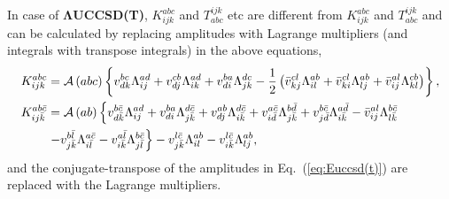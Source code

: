 \documentclass[a4paper,12pt,oneside]{book}
\newcommand{\half}{\frac{1}{2}}
\newcommand{\asop}[1]{{\cal A}\left(#1\right)}
\newcommand{\eq}[1]{Eq.~(\ref{#1})}
\newcommand{\spa}[1]{{#1}}
\newcommand{\spb}[1]{\bar{#1}}
\begin{document}
In case of \textbf{$\mathbf{\Lambda}$UCCSD(T)}, $K^{\spa{a}\spa{b}\spa{c}}_{\spa{i}\spa{j}\spa{k}}$ and $T_{\spa{a}\spa{b}\spa{c}}^{\spa{i}\spa{j}\spa{k}}$ etc 
are different from $K^{\spa{a}\spa{b}\spa{c}}_{\spa{i}\spa{j}\spa{k}}$ and $T_{\spa{a}\spa{b}\spa{c}}^{\spa{i}\spa{j}\spa{k}}$
and can be calculated by replacing amplitudes with Lagrange multipliers (and integrals with transpose integrals) in the above equations,
\begin{equation}
\begin{aligned}
K^{\spa{a}\spa{b}\spa{c}}_{\spa{i}\spa{j}\spa{k}} 
&= \asop{\spa{a}\spa{b}\spa{c}} \left\{ 
  v_{\spa{d}\spa{k}}^{\spa{b}\spa{c}} \Lambda_{\spa{i}\spa{j}}^{\spa{a}\spa{d}}
+ v_{\spa{d}\spa{j}}^{\spa{c}\spa{b}} \Lambda_{\spa{i}\spa{k}}^{\spa{a}\spa{d}}
+ v_{\spa{d}\spa{i}}^{\spa{b}\spa{a}} \Lambda_{\spa{j}\spa{k}}^{\spa{d}\spa{c}}
- \half\left(\bar v_{\spa{k}\spa{j}}^{\spa{c}\spa{l}} \Lambda_{\spa{i}\spa{l}}^{\spa{a}\spa{b}}
+ \bar v_{\spa{k}\spa{i}}^{\spa{c}\spa{l}} \Lambda_{\spa{l}\spa{j}}^{\spa{a}\spa{b}}
+ \bar v_{\spa{i}\spa{j}}^{\spa{a}\spa{l}} \Lambda_{\spa{k}\spa{l}}^{\spa{c}\spa{b}}
\right)
\right\},\\
K^{\spa{a}\spa{b}\spb{c}}_{\spa{i}\spa{j}\spb{k}} 
&= \asop{\spa{a}\spa{b}} \left\{ 
  v_{\spa{d}\spb{k}}^{\spa{b}\spb{c}} \Lambda_{\spa{i}\spa{j}}^{\spa{a}\spa{d}}
+ v_{\spa{d}\spa{i}}^{\spa{b}\spa{a}} \Lambda_{\spa{j}\spb{k}}^{\spa{d}\spb{c}}
+ v_{\spa{d}\spa{j}}^{\spa{a}\spa{b}} \Lambda_{\spa{i}\spb{k}}^{\spa{d}\spb{c}}
+ v_{\spa{i}\spb{d}}^{\spa{a}\spb{c}} \Lambda_{\spa{j}\spb{k}}^{\spa{b}\spb{d}}
+ v_{\spa{j}\spb{d}}^{\spa{b}\spb{c}} \Lambda_{\spa{i}\spb{k}}^{\spa{a}\spb{d}}
- \bar v_{\spa{i}\spa{j}}^{\spa{a}\spa{l}} \Lambda_{\spa{l}\spb{k}}^{\spa{b}\spb{c}}
\right.\\
&\left.
- v_{\spa{j}\spb{k}}^{\spa{b}\spb{l}} \Lambda_{\spa{i}\spb{l}}^{\spa{a}\spb{c}}
- v_{\spa{i}\spb{k}}^{\spa{a}\spb{l}} \Lambda_{\spa{j}\spb{l}}^{\spa{b}\spb{c}}
\right\}
- v_{\spa{j}\spb{k}}^{\spa{l}\spb{c}} \Lambda_{\spa{i}\spa{l}}^{\spa{a}\spa{b}}
- v_{\spa{i}\spb{k}}^{\spa{l}\spb{c}} \Lambda_{\spa{l}\spa{j}}^{\spa{a}\spa{b}}
,\\
\end{aligned}
\end{equation}
and the conjugate-transpose of the amplitudes in \eq{eq:Euccsd(t)} are replaced with the Lagrange multipliers.
\end{document}

